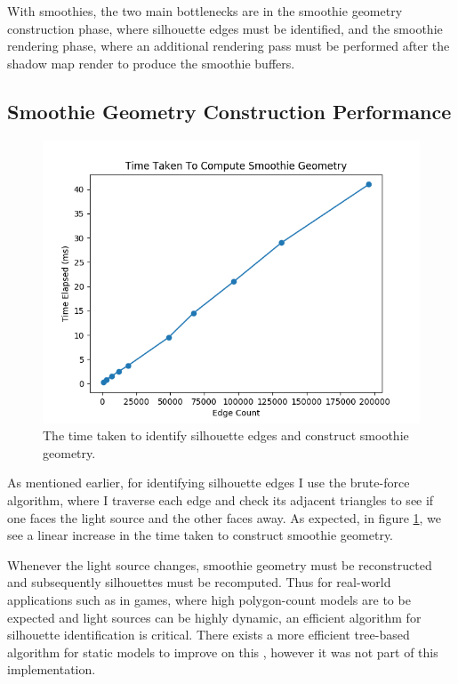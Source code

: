 \documentclass[sigconf]{acmart}
\begin{document}
With smoothies, the two main bottlenecks are in the smoothie geometry construction phase, where silhouette edges must be identified, and the smoothie rendering phase, where an additional rendering pass must be performed after the shadow map render to produce the smoothie buffers.

\subsection{Smoothie Geometry Construction Performance}

\begin{figure}[t]
    \includegraphics[width=\linewidth]{reportfiles/time-taken-to-compute-smoothie-geometry}
    \caption{The time taken to identify silhouette edges and construct smoothie geometry.}
    \label{fig:time-taken-to-compute-smoothie-geometry}
\end{figure}

As mentioned earlier, for identifying silhouette edges I use the brute-force algorithm, where I traverse each edge and check its adjacent triangles to see if one faces the light source and the other faces away. As expected, in figure \ref{fig:time-taken-to-compute-smoothie-geometry}, we see a linear increase in the time taken to construct smoothie geometry.

Whenever the light source changes, smoothie geometry must be reconstructed and subsequently silhouettes must be recomputed. Thus for real-world applications such as in games, where high polygon-count models are to be expected and light sources can be highly dynamic, an efficient algorithm for silhouette identification is critical. There exists a more efficient tree-based algorithm for static models to improve on this \cite{chan:smoothie:egsr2003}, however it was not part of this implementation.
\end{document}
